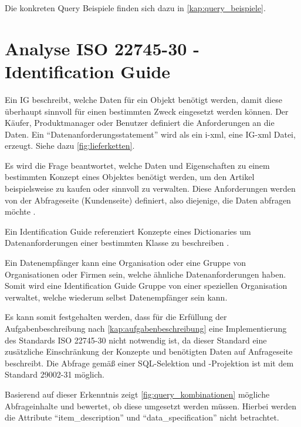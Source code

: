Die konkreten Query Beispiele finden sich dazu in \autoref{kap:query_beispiele}.

\section{Analyse ISO 22745-30 - Identification Guide}\label{kap:identification_guide}

Ein \gls{IG} beschreibt, welche Daten für ein Objekt benötigt werden, damit diese überhaupt sinnvoll für einen bestimmten Zweck eingesetzt werden können. Der Käufer, Produktmanager oder Benutzer definiert die Anforderungen an die Daten. Ein  \enquote{Datenanforderungsstatement} wird als ein i-xml, eine \gls{IG}-xml Datei, erzeugt. Siehe dazu \autoref{fig:lieferketten}. 

Es wird die Frage beantwortet, welche Daten und Eigenschaften zu einem bestimmten Konzept eines Objektes benötigt werden, um den Artikel beispielsweise zu kaufen oder sinnvoll zu verwalten. Diese Anforderungen werden von der Abfrageseite (Kundenseite) definiert, also diejenige, die Daten abfragen möchte \citep[Vergl.][]{bensonQuality}. 

Ein Identification Guide referenziert Konzepte eines Dictionaries um Datenanforderungen einer bestimmten Klasse zu beschreiben \citep[Vergl.][Kap. 5]{iso22745-30}.

Ein Datenempfänger kann eine Organisation oder eine Gruppe von Organisationen oder Firmen sein, welche ähnliche Datenanforderungen haben. Somit wird eine Identification Guide Gruppe von einer speziellen Organisation verwaltet, welche wiederum selbst Datenempfänger sein kann.  

Es kann somit festgehalten werden, dass für die Erfüllung der Aufgabenbeschreibung nach \autoref{kap:aufgabenbeschreibung} eine Implementierung des Standards ISO 22745-30 nicht notwendig ist, da dieser Standard eine zusätzliche Einschränkung der Konzepte und benötigten Daten auf Anfrageseite beschreibt. 
Die Abfrage gemäß einer SQL-Selektion und -Projektion ist mit dem Standard 29002-31 möglich. 

Basierend auf dieser Erkenntnis zeigt \autoref{fig:query_kombinationen} mögliche Abfrageinhalte und bewertet, ob diese umgesetzt werden müssen. Hierbei werden die Attribute \enquote{item\_description} und \enquote{data\_specification} nicht betrachtet.

